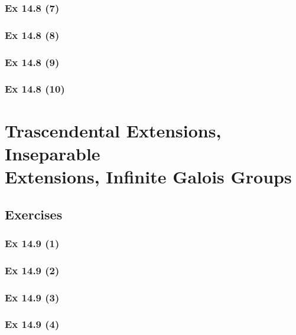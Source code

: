 \subsubsection{Ex 14.8 (7)}\label{sec:Ex_14.8.7}

\subsubsection{Ex 14.8 (8)}\label{sec:Ex_14.8.8}

\subsubsection{Ex 14.8 (9)}\label{sec:Ex_14.8.9}

\subsubsection{Ex 14.8 (10)}\label{sec:Ex_14.8.10}

\newpage		%


\section{Trascendental Extensions, Inseparable\\ Extensions, Infinite Galois Groups}\label{sec:14.9}	
\subsection*{Exercises}\label{sec:14.9_Exercises}

\subsubsection{Ex 14.9 (1)}\label{sec:Ex_14.9.1}

\subsubsection{Ex 14.9 (2)}\label{sec:Ex_14.9.2}

\subsubsection{Ex 14.9 (3)}\label{sec:Ex_14.9.3}

\subsubsection{Ex 14.9 (4)}\label{sec:Ex_14.9.4}

